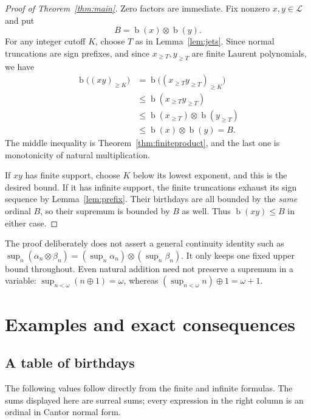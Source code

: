 \documentclass[11pt,letterpaper]{article}
\numberwithin{equation}{section}
\theoremstyle{definition}
\theoremstyle{remark}
\newcommand{\Lau}{\mathcal{L}}
\newcommand{\bd}{\operatorname{b}}
\newcommand{\np}{\mathbin{\otimes}}
\begin{document}
\begin{proof}[Proof of Theorem~\ref{thm:main}]
Zero factors are immediate. Fix nonzero $x,y\in\Lau$ and put
\[
 B=\bd(x)\np\bd(y).
\]
For any integer cutoff $K$, choose $T$ as in Lemma~\ref{lem:jets}. Since normal
truncations are sign prefixes, and since $x_{\geq T},y_{\geq T}$ are finite
Laurent polynomials, we have
\begin{align*}
 \bd\bigl((xy)_{\geq K}\bigr)
 &=\bd\bigl((x_{\geq T}y_{\geq T})_{\geq K}\bigr)\\
 &\leq\bd(x_{\geq T}y_{\geq T})\\
 &\leq\bd(x_{\geq T})\np\bd(y_{\geq T})\\
 &\leq\bd(x)\np\bd(y)=B.
\end{align*}
The middle inequality is Theorem~\ref{thm:finiteproduct}, and the last one is
monotonicity of natural multiplication.

If $xy$ has finite support, choose $K$ below its lowest exponent, and this is
the desired bound. If it has infinite support, the finite truncations exhaust
its sign sequence by Lemma~\ref{lem:prefix}. Their birthdays are all bounded
by the \emph{same} ordinal $B$, so their supremum is bounded by $B$ as well.
Thus $\bd(xy)\leq B$ in either case.
\end{proof}

The proof deliberately does not assert a general continuity identity such as
$\sup_n(\alpha_n\otimes\beta_n)
=(\sup_n\alpha_n)\otimes(\sup_n\beta_n)$.
It only keeps one fixed upper bound throughout. Even natural addition need
not preserve a supremum in a variable: $\sup_{n<\omega}(n\oplus1)=\omega$,
whereas $(\sup_{n<\omega}n)\oplus1=\omega+1$.

\section{Examples and exact consequences}
\label{sec:examples}
\subsection{A table of birthdays}
The following values follow directly from the finite and infinite formulas.
The sums displayed here are surreal sums; every expression in the right column
is an ordinal in Cantor normal form.
\end{document}
